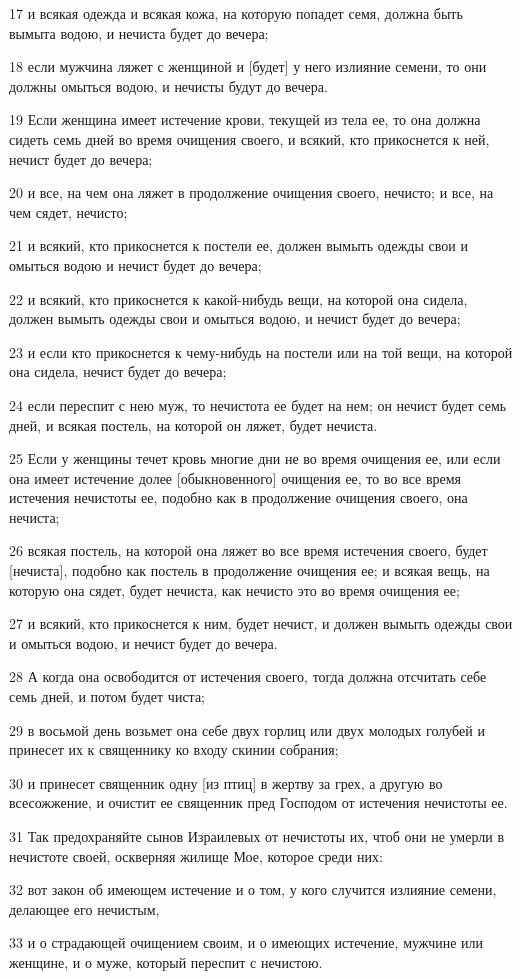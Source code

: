 \par 17 и всякая одежда и всякая кожа, на которую попадет семя, должна быть вымыта водою, и нечиста будет до вечера;
\par 18 если мужчина ляжет с женщиной и [будет] у него излияние семени, то они должны омыться водою, и нечисты будут до вечера.
\par 19 Если женщина имеет истечение крови, текущей из тела ее, то она должна сидеть семь дней во время очищения своего, и всякий, кто прикоснется к ней, нечист будет до вечера;
\par 20 и все, на чем она ляжет в продолжение очищения своего, нечисто; и все, на чем сядет, нечисто;
\par 21 и всякий, кто прикоснется к постели ее, должен вымыть одежды свои и омыться водою и нечист будет до вечера;
\par 22 и всякий, кто прикоснется к какой-нибудь вещи, на которой она сидела, должен вымыть одежды свои и омыться водою, и нечист будет до вечера;
\par 23 и если кто прикоснется к чему-нибудь на постели или на той вещи, на которой она сидела, нечист будет до вечера;
\par 24 если переспит с нею муж, то нечистота ее будет на нем; он нечист будет семь дней, и всякая постель, на которой он ляжет, будет нечиста.
\par 25 Если у женщины течет кровь многие дни не во время очищения ее, или если она имеет истечение долее [обыкновенного] очищения ее, то во все время истечения нечистоты ее, подобно как в продолжение очищения своего, она нечиста;
\par 26 всякая постель, на которой она ляжет во все время истечения своего, будет [нечиста], подобно как постель в продолжение очищения ее; и всякая вещь, на которую она сядет, будет нечиста, как нечисто это во время очищения ее;
\par 27 и всякий, кто прикоснется к ним, будет нечист, и должен вымыть одежды свои и омыться водою, и нечист будет до вечера.
\par 28 А когда она освободится от истечения своего, тогда должна отсчитать себе семь дней, и потом будет чиста;
\par 29 в восьмой день возьмет она себе двух горлиц или двух молодых голубей и принесет их к священнику ко входу скинии собрания;
\par 30 и принесет священник одну [из птиц] в жертву за грех, а другую во всесожжение, и очистит ее священник пред Господом от истечения нечистоты ее.
\par 31 Так предохраняйте сынов Израилевых от нечистоты их, чтоб они не умерли в нечистоте своей, оскверняя жилище Мое, которое среди них:
\par 32 вот закон об имеющем истечение и о том, у кого случится излияние семени, делающее его нечистым,
\par 33 и о страдающей очищением своим, и о имеющих истечение, мужчине или женщине, и о муже, который переспит с нечистою.

